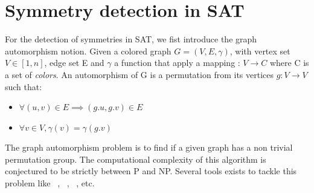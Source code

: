 %	





%
%
%

\section{Symmetry detection in SAT}

For the detection of symmetries in SAT, we fist introduce the graph automorphism notion.
Given a colored graph $G = (V, E, \gamma)$, with vertex set $V \in  [1, n] $, edge set E and
$\gamma$ a function that apply a mapping : $V \rightarrow C$ where C is a set of \emph{colors}.
An automorphism of G is a permutation from its vertices $g :V \rightarrow V$ 
such that:
\begin{itemize}
	\item $\forall (u, v) \in E \implies (g.u, g.v) \in E$
	\item $\forall v \in V, \gamma(v) = \gamma(g.v)$
\end{itemize}

The graph automorphism problem is to find if a given graph has a non trivial permutation group. 
The computational complexity of this algorithm is conjectured to be strictly between P and NP.
Several tools exists to tackle this problem like \saucy~\cite{katebi2010symmetry},
\bliss~\cite{JunttilaKaski:ALENEX2007}, \nauty~\cite{mckay2003nauty}, etc.



